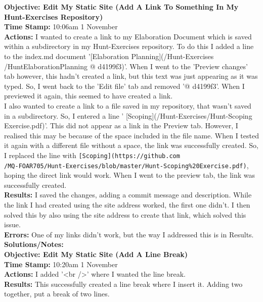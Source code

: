 \documentclass{article}
\begin{document}
\begin{FlushLeft}
\vspace{5mm}
\textbf{Objective: Edit My Static Site (Add A Link To Something In My Hunt-Exercises Repository)}\\ 
\textbf{Time Stamp:} 10:06am 1 November\\
\textbf{Actions:} I wanted to create a link to my Elaboration Document which is saved within a subdirectory in my Hunt-Exercises repository. To do this I added a line to the index.md document '[Elaboration Planning](/Hunt-Exercises\\/Hunt\textunderscore Elaboration\textunderscore Planning @ d4199f3)'. When I went to the 'Preview changes' tab however, this hadn't created a link, but this text was just appearing as it was typed. So, I went back to the 'Edit file' tab and removed '@ d4199f3'. When I previewed it again, this seemed to have created a link.\\
I also wanted to create a link to a file saved in my repository, that wasn't saved in a subdirectory. So, I entered a line '
[Scoping](/Hunt-Exercises/Hunt-Scoping Exercise.pdf)'. This did not appear as a link in the Preview tab. However, I realised this may be because of the space included in the file name. When I tested it again with a different file without a space, the link was successfully created. So, I replaced the line with \verb|[Scoping](https://github.com|\\ \verb|/MQ-FOAR705/Hunt-Exercises/blob/master/Hunt-Scoping%20Exercise.pdf)|, hoping the direct link would work. When I went to the preview tab, the link was successfully created.\\
\textbf{Results:} I saved the changes, adding a commit message and description. While the link I had created using the site address worked, the first one didn't. I then solved this by also using the site address to create that link, which solved this issue.\\
\textbf{Errors:} One of my links didn't work, but the way I addressed this is in Results.\\
\textbf{Solutions/Notes:}\\
\vspace{5mm}
\textbf{Objective: Edit My Static Site (Add A Line Break)}\\ 
\textbf{Time Stamp:} 10:20am 1 November\\
\textbf{Actions:} I added '\textless br /\textgreater' where I wanted the line break. \\
\textbf{Results:} This successfully created a line break where I insert it. Adding two together, put a break of two lines.\\

\end{FlushLeft}
\end{document}
